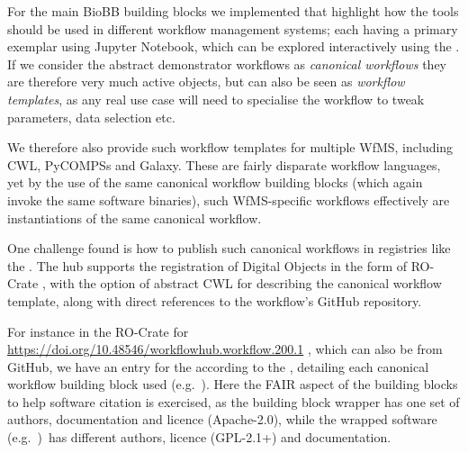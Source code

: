 For the main BioBB building blocks we implemented  that highlight how the tools should be used in different workflow management systems; each having a primary exemplar using Jupyter Notebook, which can be explored interactively using the .
If we consider the abstract demonstrator workflows as \emph{canonical workflows} they are therefore very much active objects, but can also be seen as \emph{workflow templates}, as any real use case will need to specialise the workflow to tweak parameters, data selection etc.

We therefore also provide such workflow templates for multiple WfMS, including CWL, PyCOMPSs and Galaxy.
These are fairly disparate workflow languages, yet by the use of the same canonical workflow building blocks (which again invoke the same software binaries), such WfMS-specific workflows effectively are instantiations of the same canonical workflow.

One challenge found is how to publish such canonical workflows in registries like the .
The hub supports the registration of Digital Objects in the form of RO-Crate \cite{Soiland-Reyes 2022}, with the option of abstract CWL for describing the canonical workflow template, along with direct references to the workflow's GitHub repository.

\clearpage %
For instance in the RO-Crate for \url{https://doi.org/10.48546/workflowhub.workflow.200.1} \cite{ch6-26}, which can also be
 from GitHub, we have an entry for the 
according to the
, 
detailing each canonical workflow building block used 
(e.g.~).
Here the FAIR aspect of the building blocks to help software citation is exercised, as the building block wrapper has one set of authors, documentation and licence (Apache-2.0), while the wrapped software 
(e.g.~)~has different authors, licence (GPL-2.1+) and documentation.

